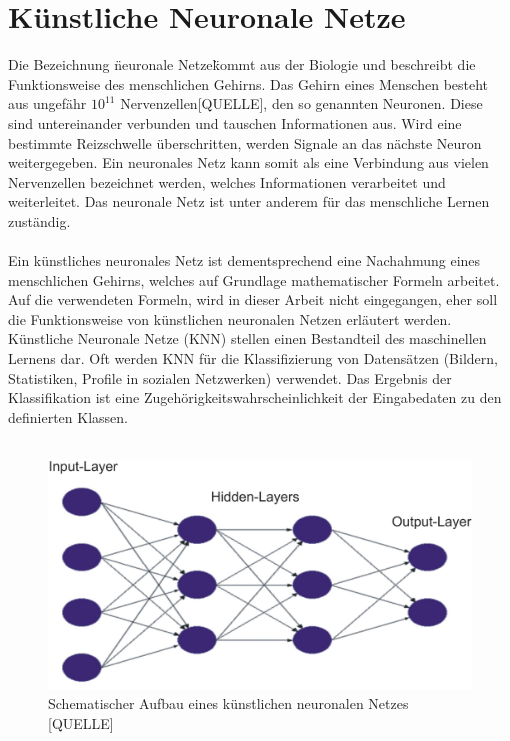 \documentclass[a4paper,12pt,oneside]{article}
\begin{document}
  \section{Künstliche Neuronale Netze}  
Die Bezeichnung \"neuronale Netze\" kommt aus der Biologie und beschreibt die Funktionsweise des menschlichen Gehirns. Das Gehirn eines Menschen besteht aus ungefähr $10^{11}$ Nervenzellen[QUELLE], den so genannten Neuronen. Diese sind untereinander verbunden und tauschen Informationen aus. Wird eine bestimmte Reizschwelle überschritten, werden Signale an das nächste Neuron weitergegeben. Ein neuronales Netz kann somit als eine Verbindung aus vielen Nervenzellen bezeichnet werden, welches Informationen verarbeitet und weiterleitet. Das neuronale Netz ist unter anderem für das menschliche Lernen zuständig. 
\\
\\
Ein künstliches neuronales Netz ist dementsprechend eine Nachahmung eines menschlichen Gehirns, welches auf Grundlage mathematischer Formeln arbeitet. Auf die verwendeten Formeln, wird in dieser Arbeit nicht eingegangen, eher soll die Funktionsweise von künstlichen neuronalen Netzen erläutert werden. Künstliche Neuronale Netze (KNN) stellen einen Bestandteil des maschinellen Lernens dar. Oft werden KNN für die Klassifizierung von Datensätzen (Bildern, Statistiken, Profile in sozialen Netzwerken) verwendet. Das Ergebnis der Klassifikation ist eine Zugehörigkeitswahrscheinlichkeit der Eingabedaten zu den definierten Klassen.
\\
\\
\begin{figure}
	[h]
	\centering
	\includegraphics[scale=0.5]{Sources/nnet.png}
		\caption{Schematischer Aufbau eines künstlichen neuronalen Netzes [QUELLE] }
	\label{img:KNN}
\end{figure}
\\
\end{document}
